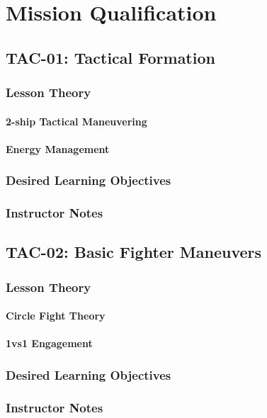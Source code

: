 \part{Mission Qualification}
  \chapter{TAC-01: Tactical Formation}
    \section{Lesson Theory}
      \subsection{2-ship Tactical Maneuvering}
      \subsection{Energy Management}
    \section{Desired Learning Objectives}
    \section{Instructor Notes}

  \chapter{TAC-02: Basic Fighter Maneuvers}
    \section{Lesson Theory}
      \subsection{Circle Fight Theory}
      \subsection{1vs1 Engagement}
    \section{Desired Learning Objectives}
    \section{Instructor Notes}

